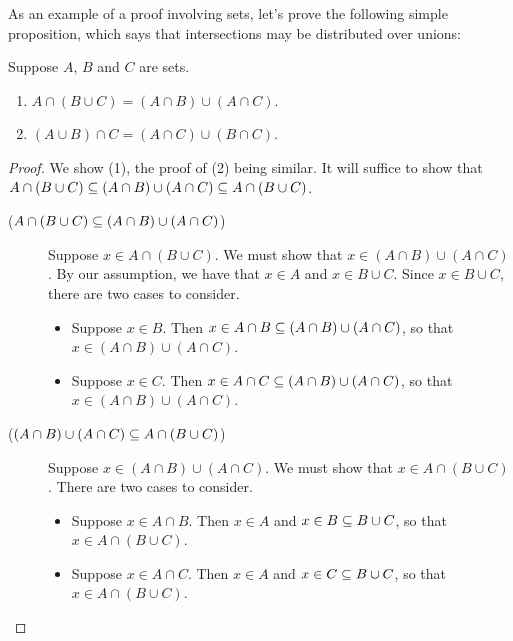 As an example of a proof involving sets, let's prove
the following simple proposition, which says that intersections
may be distributed over unions:
%

\begin{proposition}
\label{InterOverUnionProp}
Suppose $A$, $B$ and $C$ are sets.

\begin{enumerate}[\quad(1)]
\item $A\cap(B\cup C)=(A\cap B)\cup(A\cap C)$.

\item $(A\cup B)\cap C=(A\cap C)\cup(B\cap C)$.
\end{enumerate}
\end{proposition}

\begin{proof}
We show (1), the proof of (2) being similar.
It will suffice to show that $A\cap(B\cup C)\subseteq(A\cap B)\cup(A\cap C)\subseteq
A\cap(B\cup C)$.

\begin{description}
\item[\quad($A\cap(B\cup C)\subseteq(A\cap B)\cup(A\cap C)$)] Suppose
$x\in A\cap(B\cup C)$.  We must show that
$x\in (A\cap B)\cup(A\cap C)$.
By our assumption, we have that  $x\in A$ and $x\in B\cup C$.
Since $x\in B\cup C$, there are two cases to consider.
\begin{itemize}
\item Suppose $x\in B$.  Then $x\in A\cap B\subseteq (A\cap B)\cup(A\cap C)$,
so that $x\in(A\cap B)\cup(A\cap C)$.

\item Suppose $x\in C$.  Then $x\in A\cap C\subseteq (A\cap B)\cup(A\cap C)$,
so that $x\in(A\cap B)\cup(A\cap C)$.
\end{itemize}

\item[\quad($(A\cap B)\cup(A\cap C)\subseteq A\cap(B\cup C)$)] Suppose
$x\in (A\cap B)\cup(A\cap C)$.  We must show that
$x\in A\cap(B\cup C)$.
There are two cases to consider.
\begin{itemize}
\item Suppose $x\in A\cap B$.  Then $x\in A$ and $x\in B\subseteq B\cup C$,
so that $x\in A\cap(B\cup C)$.

\item Suppose $x\in A\cap C$.  Then $x\in A$ and $x\in C\subseteq B\cup C$,
so that $x\in A\cap(B\cup C)$.
\end{itemize}
\end{description}
\end{proof}

